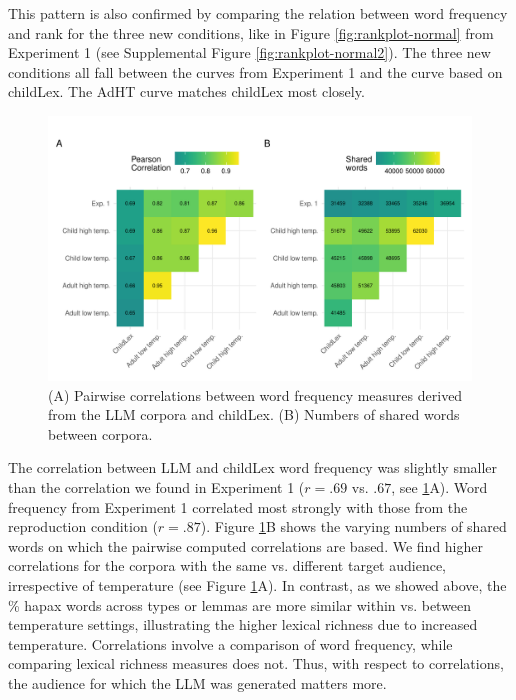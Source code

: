 \documentclass[doc, a4paper]{apa7}
\begin{document}
This pattern is also confirmed by comparing the relation between word frequency and rank for the three new conditions, like in Figure \ref{fig:rankplot-normal} from Experiment 1 (see Supplemental Figure \ref{fig:rankplot-normal2}). The three new conditions all fall between the curves from Experiment 1 and the curve based on childLex. The AdHT curve matches childLex most closely. 

\begin{figure}[!htbp]
  \centerline{
    \includegraphics[width=1.1\textwidth]{figures/combined_plotc.pdf}}
    \caption{(A) Pairwise correlations between word frequency measures derived from the LLM corpora and childLex. (B) Numbers of shared words between corpora.}
    \label{fig:combined_plotc}
\end{figure}

The correlation between LLM and childLex word frequency was slightly smaller than the correlation we found in Experiment 1 ($r = .69$ vs. $.67$, see \ref{fig:combined_plotc}A). Word frequency from Experiment 1 correlated most strongly with those from the reproduction condition ($r = .87$). Figure \ref{fig:combined_plotc}B shows the varying numbers of shared words on which the pairwise computed correlations are based. We find higher correlations for the corpora with the same vs. different target audience, irrespective of temperature (see Figure \ref{fig:combined_plotc}A). In contrast, as we showed above, the \% hapax words across types or lemmas are more similar within vs. between temperature settings, illustrating the higher lexical richness due to increased temperature. Correlations involve a comparison of word frequency, while comparing lexical richness measures does not. Thus, with respect to correlations, the audience for which the LLM was generated matters more. 
\end{document}
